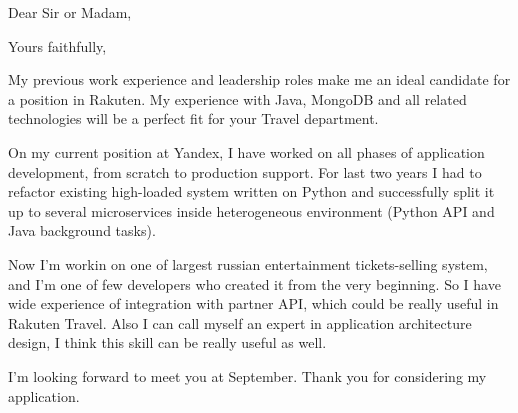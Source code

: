 \documentclass[11pt,a4paper,sans]{moderncv}        %
\begin{document}
\clearpage
\date{July 30, 2017}
\opening{Dear Sir or Madam,}
\closing{Yours faithfully,}
\makelettertitle

My previous work experience and leadership roles make me an ideal candidate for a position in Rakuten. My experience with Java, MongoDB and all related technologies will be a perfect fit for your Travel department.

On my current position at Yandex, I have worked on all phases of application development, from scratch to production support. For last two years I had to refactor existing high-loaded system written on Python and successfully split it up to several microservices inside heterogeneous environment (Python API and Java background tasks).

Now I'm workin on one of largest russian entertainment tickets-selling system, and I'm one of few developers who created it from the very beginning. So I have wide experience of integration with partner API, which could be really useful in Rakuten Travel. Also I can call myself an expert in application architecture design, I think this skill can be really useful as well.

I'm looking forward to meet you at September. Thank you for considering my application.

\makeletterclosing

\end{document}
